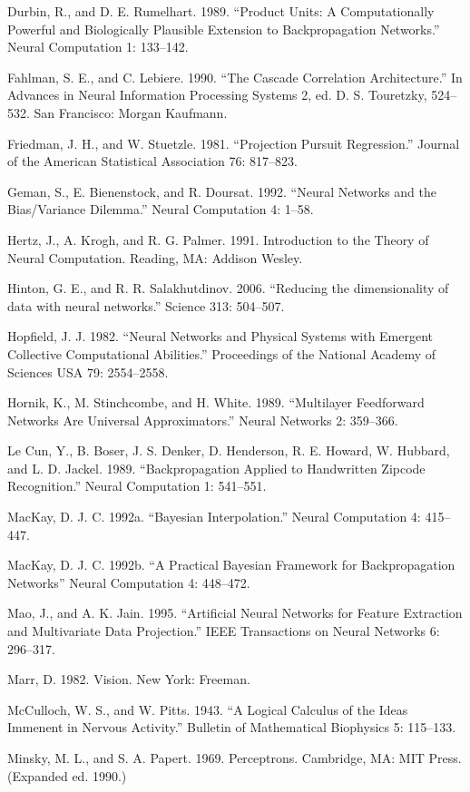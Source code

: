 Durbin, R., and D. E. Rumelhart. 1989. “Product Units: A Computationally Powerful and Biologically Plausible Extension to Backpropagation Networks.” Neural Computation 1: 133--142.

Fahlman, S. E., and C. Lebiere. 1990. “The Cascade Correlation Architecture.” In Advances in Neural Information Processing Systems 2, ed. D. S. Touretzky, 524--532. San Francisco: Morgan Kaufmann.

Friedman, J. H., and W. Stuetzle. 1981. “Projection Pursuit Regression.” Journal of the American Statistical Association 76: 817--823.

Geman, S., E. Bienenstock, and R. Doursat. 1992. “Neural Networks and the Bias/Variance Dilemma.” Neural Computation 4: 1--58.

Hertz, J., A. Krogh, and R. G. Palmer. 1991. Introduction to the Theory of Neural Computation. Reading, MA: Addison Wesley.

Hinton, G. E., and R. R. Salakhutdinov. 2006. “Reducing the dimensionality of data with neural networks.” Science 313: 504--507.

Hopfield, J. J. 1982. “Neural Networks and Physical Systems with Emergent Collective Computational Abilities.” Proceedings of the National Academy of Sciences USA 79: 2554--2558.

Hornik, K., M. Stinchcombe, and H. White. 1989. “Multilayer Feedforward Networks Are Universal Approximators.” Neural Networks 2: 359--366.

Le Cun, Y., B. Boser, J. S. Denker, D. Henderson, R. E. Howard, W. Hubbard, and L. D. Jackel. 1989. “Backpropagation Applied to Handwritten Zipcode Recognition.” Neural Computation 1: 541--551.

MacKay, D. J. C. 1992a. “Bayesian Interpolation.” Neural Computation 4: 415-- 447.

MacKay, D. J. C. 1992b. “A Practical Bayesian Framework for Backpropagation Networks” Neural Computation 4: 448--472.

Mao, J., and A. K. Jain. 1995. “Artificial Neural Networks for Feature Extraction and Multivariate Data Projection.” IEEE Transactions on Neural Networks 6: 296--317.

Marr, D. 1982. Vision. New York: Freeman.

McCulloch, W. S., and W. Pitts. 1943. “A Logical Calculus of the Ideas Immenent in Nervous Activity.” Bulletin of Mathematical Biophysics 5: 115--133.

Minsky, M. L., and S. A. Papert. 1969. Perceptrons. Cambridge, MA: MIT Press. (Expanded ed. 1990.)

